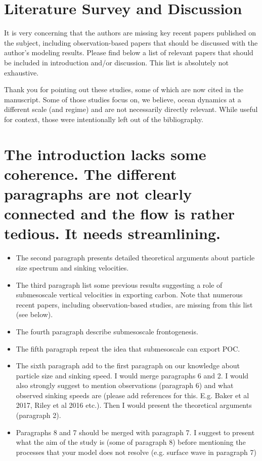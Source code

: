 \documentclass[12pt,letter]{article}
\begin{document}
\section*{Literature Survey and Discussion}
It is very concerning that the authors are missing key recent papers published on the subject, including observation-based papers that should be discussed with the author's modeling results. Please find below a list of relevant papers that should be included in introduction and/or discussion. This list is absolutely not exhaustive.

{\color{blue} Thank you for pointing out these studies, some of which are now cited in the manuscript. Some of those studies focus on, we believe, ocean dynamics at a different scale (and regime) and are not necessarily directly relevant. While useful for context, those were intentionally left out of the bibliography.\\}


\section*{The introduction lacks some coherence. The different paragraphs are not clearly connected and the flow is rather tedious. It needs streamlining. }
\begin{itemize}
	\item	The second paragraph presents detailed theoretical arguments about particle size spectrum and sinking velocities.
	\item	The third paragraph list some previous results suggesting a role of submesoscale vertical velocities in exporting carbon. Note that numerous recent papers, including observation-based studies, are missing from this list (see below).
	\item	The fourth paragraph describe submesoscale frontogenesis.
	\item	The fifth paragraph repeat the idea that submesoscale can export POC.
	\item	The sixth paragraph add to the first paragraph on our knowledge about particle size and sinking speed. I would merge paragraphs 6 and 2. I would also strongly suggest to mention observations (paragraph 6) and what observed sinking speeds are (please add references for this. E.g. Baker et al 2017, Riley et al 2016 etc.). Then I would present the theoretical arguments (paragraph 2).
	\item	Paragraphs 8 and 7 should be merged with paragraph 7. I suggest to present what the aim of the study is (some of paragraph 8) before mentioning the processes that your model does not resolve (e.g. surface wave in paragraph 7)
\end{itemize}
\end{document}
